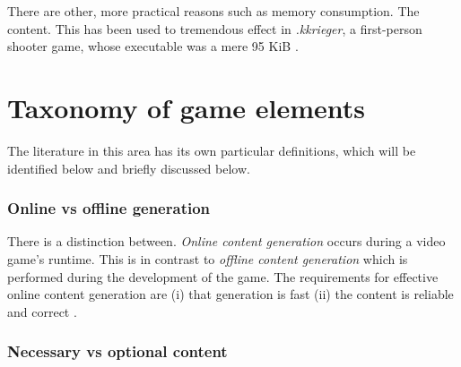 \documentclass[11pt, a4paper, oneside]{report} %
\begin{document}
There are other, more practical reasons such as memory
consumption. The content. This has been used to tremendous effect in \textit{.kkrieger}, a
first-person shooter game, whose executable was a mere 95 KiB
\cite{Hendrikx:2013:PCG:2422956.2422957}.








\section{Taxonomy of game elements}

The literature in this area has its own particular definitions, which will be
identified below and briefly discussed below.

\subsubsection{Online vs offline generation}

There is a distinction between. \textit{Online content generation} occurs during
a video game's runtime. This is in contrast to \textit{offline content
generation} which is performed during the development of the game. The
requirements for effective online content generation are (i) that generation is
fast (ii) the content is reliable and correct \cite{5756645}.

\subsubsection{Necessary vs optional content}
\end{document}
